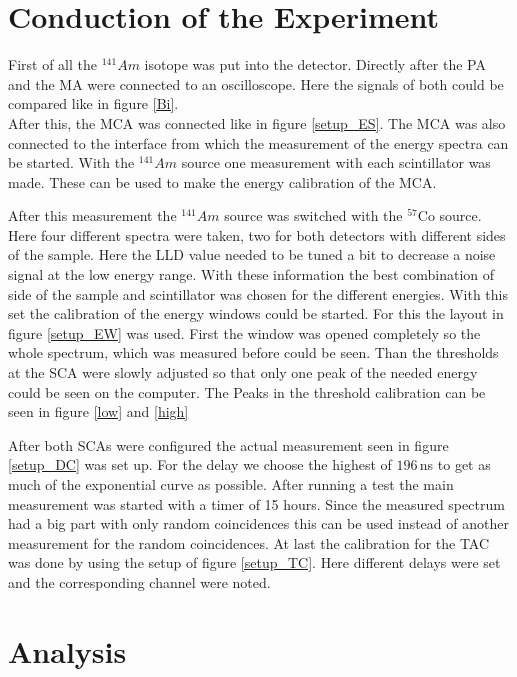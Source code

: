 \documentclass[30pt,a4paper]{article}
\begin{document}
 	\section{Conduction of the Experiment}
 	First of all the $^{141}Am$ isotope was put into the detector. Directly after the PA and the MA were connected to an oscilloscope. Here the signals of both could be compared like in figure \ref{Bi}.\\
 	After this, the MCA was connected like in figure \ref{setup_ES}. The MCA was also connected to the interface from which the measurement of the energy spectra can be started. With the $^{141}Am$ source one measurement with each scintillator was made. These can be used to make the energy calibration of the MCA.\par
 	After this measurement the  $^{141}Am$ source was switched with the $^{57}$Co source. Here four different spectra were taken, two for both detectors with different sides of the sample. Here the LLD value needed to be tuned a bit to decrease a noise signal at the low energy range. With these information the best combination of side of the sample and scintillator was chosen for the different energies. With this set the calibration of the energy windows could be started. For this the layout in figure \ref{setup_EW} was used. First the window was opened completely so the whole spectrum, which was measured before could be seen. Than the thresholds at the SCA were slowly adjusted so that only one peak of the needed energy could be seen on the computer. The Peaks in the threshold calibration can be seen in figure \ref{low} and \ref{high}\par
 	After both SCAs were configured the actual measurement seen in figure \ref{setup_DC} was set up. For the delay we choose the highest of $196$\,ns to get as much of the exponential curve as possible. After running a test the main measurement was started with a timer of 15 hours. Since the measured spectrum had a big part with only random coincidences this can be used instead of another measurement for the random coincidences. At last the calibration for the TAC was done by using the setup of figure \ref{setup_TC}. Here different delays were set and the corresponding channel were noted.
 	\section{Analysis}
\end{document}
